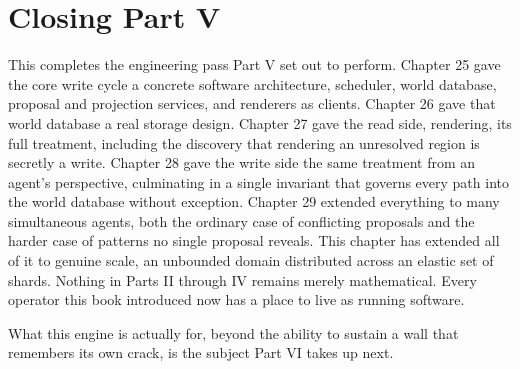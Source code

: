 \section{Closing Part V}

This completes the engineering pass Part V set out to perform. Chapter 25 gave the core write cycle a concrete software architecture, scheduler, world database, proposal and projection services, and renderers as clients. Chapter 26 gave that world database a real storage design. Chapter 27 gave the read side, rendering, its full treatment, including the discovery that rendering an unresolved region is secretly a write. Chapter 28 gave the write side the same treatment from an agent's perspective, culminating in a single invariant that governs every path into the world database without exception. Chapter 29 extended everything to many simultaneous agents, both the ordinary case of conflicting proposals and the harder case of patterns no single proposal reveals. This chapter has extended all of it to genuine scale, an unbounded domain distributed across an elastic set of shards. Nothing in Parts II through IV remains merely mathematical. Every operator this book introduced now has a place to live as running software.

What this engine is actually for, beyond the ability to sustain a wall that remembers its own crack, is the subject Part VI takes up next.
